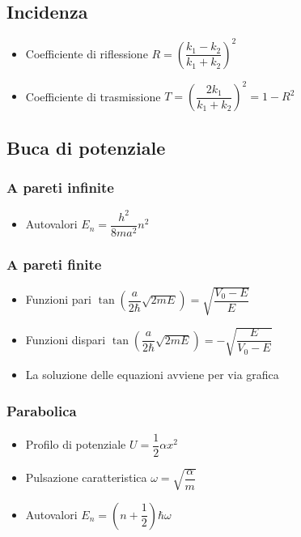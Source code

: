 \documentclass{article}
\begin{document}
\subsection{Incidenza}
\begin{itemize}
  \item Coefficiente di riflessione \( R = \left( \dfrac{k_1 - k_2}{k_1 + k_2} \right) ^ 2 \)
  \item Coefficiente di trasmissione \( T = \left( \dfrac{2 k_1}{k_1 + k_2} \right) ^ 2 = 1 - R ^ 2 \)
\end{itemize}

\subsection{Buca di potenziale}

\subsubsection{A pareti infinite}
\begin{itemize}
  \item Autovalori \( E_n = \dfrac{h^2}{8 m a ^2} n^2 \)
\end{itemize}

\subsubsection{A pareti finite}
\begin{itemize}
  \item Funzioni pari \( \tan\left( \dfrac{a}{2 \hbar} \sqrt{2mE} \right) = \sqrt{\dfrac{V_0 - E}{E}} \)
  \item Funzioni dispari \( \tan\left( \dfrac{a}{2 \hbar} \sqrt{2mE} \right) = - \sqrt{\dfrac{E}{V_0 - E}} \)
  \item La soluzione delle equazioni avviene per via grafica
\end{itemize}

\subsubsection{Parabolica}
\begin{itemize}
  \item Profilo di potenziale \(U = \dfrac{1}{2} \alpha x ^ 2 \)
  \item Pulsazione caratteristica \( \omega = \sqrt{\dfrac{\alpha}{m}} \)
  \item Autovalori \( E_n = ( n + \dfrac{1}{2} ) \hbar \omega \)
\end{itemize}
\end{document}
